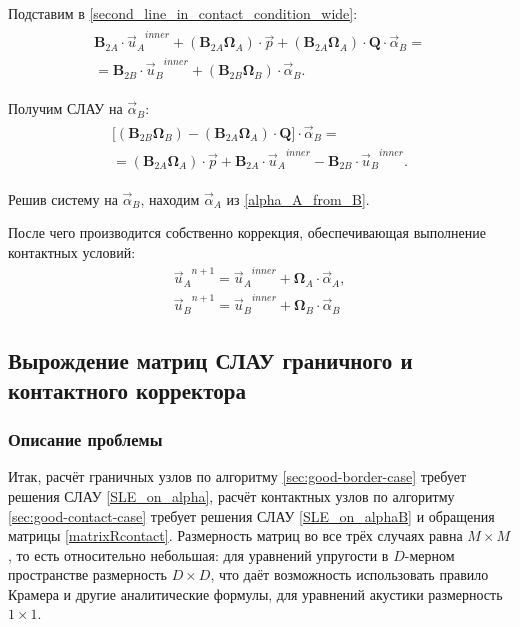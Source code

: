 \documentclass[a4paper]{article}
\numberwithin{equation}{section}
\begin{document}
Подставим в \eqref{second_line_in_contact_condition_wide}:
\begin{eqnarray}
\begin{split}
\mathbf{B}_{2A} \cdot {\vec{u}_A}^{inner} + (\mathbf{B}_{2A} \mathbf{\Omega}_A) \cdot \vec{p} + (\mathbf{B}_{2A} \mathbf{\Omega}_A) \cdot \mathbf{Q} \cdot \vec{\alpha}_B = \\ =
\mathbf{B}_{2B} \cdot {\vec{u}_B}^{inner} + (\mathbf{B}_{2B} \mathbf{\Omega}_B) \cdot \vec{\alpha}_B.
\end{split}
\end{eqnarray}

Получим СЛАУ на $\vec{\alpha}_B$:
\begin{eqnarray}
\label{SLE_on_alphaB}
\begin{split}
\Bigg[  (\mathbf{B}_{2B} \mathbf{\Omega}_B) - (\mathbf{B}_{2A} \mathbf{\Omega}_A) \cdot \mathbf{Q}  \Bigg] \cdot \vec{\alpha}_B = \\ = 
(\mathbf{B}_{2A} \mathbf{\Omega}_A) \cdot \vec{p} + \mathbf{B}_{2A} \cdot {\vec{u}_A}^{inner} - \mathbf{B}_{2B} \cdot {\vec{u}_B}^{inner}.
\end{split}
\end{eqnarray}

Решив систему на $\vec{\alpha}_B$, находим $\vec{\alpha}_A$ из \eqref{alpha_A_from_B}.

После чего производится собственно коррекция, обеспечивающая выполнение контактных условий:
\begin{eqnarray}
{\vec{u}_A}^{n+1} = {\vec{u}_A}^{inner} + \mathbf{\Omega}_A \cdot \vec{\alpha}_A, \\
{\vec{u}_B}^{n+1} = {\vec{u}_B}^{inner} + \mathbf{\Omega}_B \cdot \vec{\alpha}_B
\end{eqnarray}


\subsection{Вырождение матриц СЛАУ граничного и контактного корректора}
\subsubsection{Описание проблемы}
\label{degeneration_problem}
Итак, расчёт граничных узлов по алгоритму \ref{sec:good-border-case} 
требует решения СЛАУ \ref{SLE_on_alpha}, 
расчёт контактных узлов по алгоритму \ref{sec:good-contact-case} требует 
решения СЛАУ \ref{SLE_on_alphaB} и обращения матрицы \ref{matrixRcontact}.
Размерность матриц во все трёх случаях равна $M \times M$, 
то есть относительно небольшая: для уравнений упругости в $D$-мерном 
пространстве размерность $D \times D$, что даёт возможность 
использовать правило Крамера и другие аналитические формулы, 
для уравнений акустики размерность $1 \times 1$. 
\end{document}
